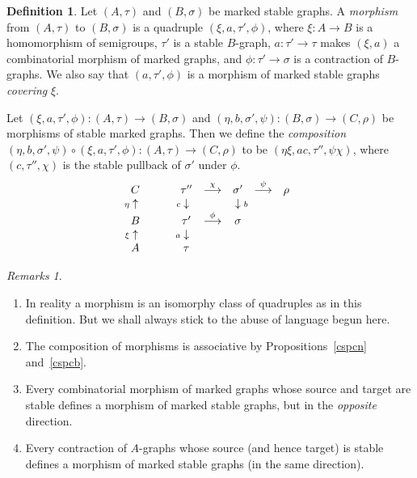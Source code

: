 \documentclass[11pt]{amsart}
\theoremstyle{definition}
\newtheorem{defn}[prop]{Definition}
\theoremstyle{remark}
\newtheorem{rmks}{Remarks}\renewcommand{\thermks}{}
\newcommand{\comp}{\mathbin{{\scriptstyle\circ}}}
\newcommand{\ldiag}[1]
       {\makebox[0cm]{\({\scriptstyle#1}\downarrow\phantom{\scriptstyle#1}\)}}
\newcommand{\ldiagup}[1]
       {\makebox[0cm]{\({\scriptstyle#1}\uparrow\phantom{\scriptstyle#1}\)}}
\newcommand{\rdiag}[1]
       {\makebox[0cm]{\(\phantom{\scriptstyle#1}\downarrow{\scriptstyle#1}\)}}
\theoremstyle{plain}
\theoremstyle{definition}
\theoremstyle{remark}
\begin{document}
\begin{defn} \label{dmmsg}
Let \((A,\tau)\) and \((B,\sigma)\) be marked stable graphs. A {\em morphism } from
\((A,\tau)\) to \((B,\sigma)\) is a
quadruple \((\xi,a,\tau',\phi)\), where \(\xi:A\rightarrow B\) is a homomorphism of
semigroups, \(\tau'\) is a stable
\(B\)-graph, \(a:\tau'\rightarrow\tau\) makes \((\xi,a)\) a combinatorial morphism of
marked graphs, and
\(\phi:\tau'\rightarrow\sigma\) is a contraction of \(B\)-graphs. We also say that
\((a,\tau',\phi)\) is a morphism of marked
stable graphs {\em covering }\(\xi\).

Let \((\xi,a,\tau',\phi):(A,\tau)\rightarrow(B,\sigma)\) and
\((\eta,b,\sigma',\psi):(B,\sigma)\rightarrow(C,\rho)\) be
morphisms of stable marked graphs. Then we define the {\em composition }
\((\eta,b,\sigma',\psi)\comp(\xi,a,\tau',\phi):(A,\tau)\rightarrow(C,\rho)\) to
be \((\eta\xi,a c,\tau'',\psi\chi)\), where
\((c,\tau'',\chi)\) is the stable pullback of \(\sigma'\) under \(\phi\).
\[
\begin{array}{ccccccc}
C & & \tau'' & \stackrel{\chi}{\longrightarrow} & \sigma' &
\stackrel{\psi}{\longrightarrow} & \rho \\
\ldiagup{\eta} & \phantom{\longrightarrow} & \ldiag{c} &  & \rdiag{b} & & \\
B & & \tau' & \stackrel{\phi}{\longrightarrow} & \sigma & & \\
\ldiagup{\xi} & & \ldiag{a} & & & & \\
A & & \tau & & & &
\end{array}
\]
\end{defn}

\begin{rmks}
\begin{enumerate}
\item In reality a morphism is an isomorphy class of quadruples as in this
definition. But we shall always stick to the
abuse of language begun here.
\item The composition of morphisms is associative by Propositions~\ref{cspcn}
and~\ref{cspcb}.
\item Every combinatorial morphism of marked graphs whose source and target are
stable defines a morphism of marked
stable graphs, but in the {\em opposite } direction.
\item Every contraction of \(A\)-graphs whose source (and hence target) is stable
defines a morphism of marked stable
graphs (in the same direction).
\end{enumerate}
\end{rmks}
\end{document}
